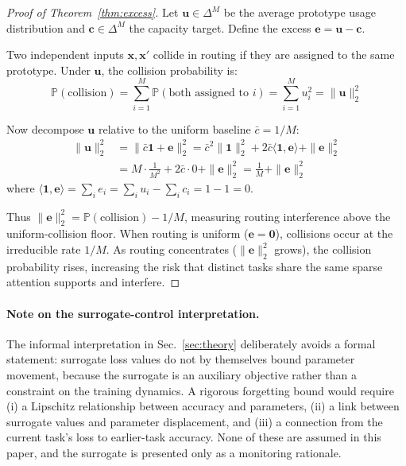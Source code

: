 \documentclass[11pt,a4paper]{article}
\theoremstyle{definition}
\begin{document}
\begin{proof}[Proof of Theorem~\ref{thm:excess}]
Let $\mathbf{u} \in \Delta^{M}$ be the average prototype usage distribution and $\mathbf{c} \in \Delta^{M}$ the capacity target. Define the excess $\mathbf{e} = \mathbf{u} - \mathbf{c}$.

Two independent inputs $\mathbf{x}, \mathbf{x}'$ collide in routing if they are assigned to the same prototype. Under $\mathbf{u}$, the collision probability is:
\begin{equation}
\mathbb{P}(\text{collision}) = \sum_{i=1}^M \mathbb{P}(\text{both assigned to } i) = \sum_{i=1}^M u_i^2 = \|\mathbf{u}\|_2^2
\end{equation}

Now decompose $\mathbf{u}$ relative to the uniform baseline $\bar{c} = 1/M$:
\begin{align}
\|\mathbf{u}\|_2^2 &= \|\bar{c}\mathbf{1} + \mathbf{e}\|_2^2 = \bar{c}^2\|\mathbf{1}\|_2^2 + 2\bar{c}\langle\mathbf{1},\mathbf{e}\rangle + \|\mathbf{e}\|_2^2 \\
&= M \cdot \frac{1}{M^2} + 2\bar{c} \cdot 0 + \|\mathbf{e}\|_2^2 = \frac{1}{M} + \|\mathbf{e}\|_2^2
\end{align}
where $\langle\mathbf{1},\mathbf{e}\rangle = \sum_i e_i = \sum_i u_i - \sum_i c_i = 1 - 1 = 0$.

Thus $\|\mathbf{e}\|_2^2 = \mathbb{P}(\text{collision}) - 1/M$, measuring routing interference above the uniform-collision floor. When routing is uniform ($\mathbf{e} = \mathbf{0}$), collisions occur at the irreducible rate $1/M$. As routing concentrates ($\|\mathbf{e}\|_2^2$ grows), the collision probability rises, increasing the risk that distinct tasks share the same sparse attention supports and interfere.
\end{proof}

\paragraph{Note on the surrogate-control interpretation.}
The informal interpretation in Sec.~\ref{sec:theory} deliberately avoids a formal statement: surrogate loss values do not by themselves bound parameter movement, because the surrogate is an auxiliary objective rather than a constraint on the training dynamics. A rigorous forgetting bound would require (i) a Lipschitz relationship between accuracy and parameters, (ii) a link between surrogate values and parameter displacement, and (iii) a connection from the current task's loss to earlier-task accuracy. None of these are assumed in this paper, and the surrogate is presented only as a monitoring rationale.
\end{document}
